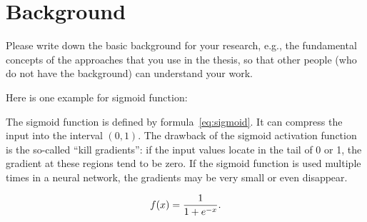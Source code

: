 \chapter{Background}
\label{cp:Background}

Please write down the basic background for your research, e.g., the fundamental concepts of the approaches that you use in the thesis, so that other people (who do not have the background) can understand your work.

Here is one example for sigmoid function:

The sigmoid function is defined by formula~\ref{eq:sigmoid}. It can compress the input into the interval $(0, 1)$. The drawback of the sigmoid activation function is the so-called ``kill gradients'': if the input values locate in the tail of 0 or 1, the gradient at these regions tend to be zero. If the sigmoid function is used multiple times in a neural network, the gradients may be very small or even disappear.

\begin{equation}
\label{eq:sigmoid}
\centering{f(x) = \frac{1}{1 + e^{-x}}}.
\end{equation}





